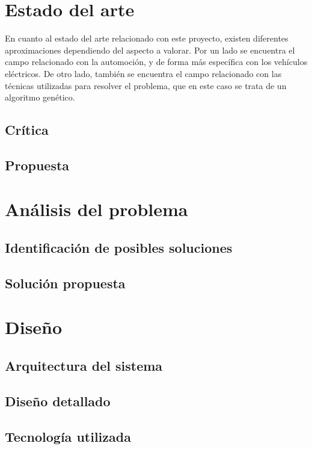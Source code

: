 \documentclass[11pt,spanish,listoffigures,listoftables]{tfgetsinf}
\begin{document}
\chapter{Estado del arte}
En cuanto al estado del arte relacionado con este proyecto, existen diferentes aproximaciones dependiendo del aspecto a valorar. Por un lado se encuentra el campo relacionado con la automoción, y de forma más específica con los vehículos eléctricos. De otro lado, también se encuentra el campo relacionado con las técnicas utilizadas para resolver el problema, que en este caso se trata de un algoritmo genético.
\newpage
\section{Crítica}

\section{Propuesta}

\chapter{Análisis del problema}

\section{Identificación de posibles soluciones}

\section{Solución propuesta}

\chapter{Diseño}
\section{Arquitectura del sistema}

\section{Diseño detallado}

\section{Tecnología utilizada}
\end{document}
